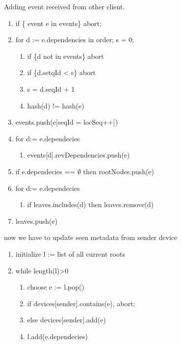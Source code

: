 
\noindent Adding event received from other client.
\begin{enumerate}
    \item if \{ event e in events\} abort;
    \item for d := e.dependencies in order; s = 0;
    \begin{enumerate}
        \item if \{d not in events\} abort
        \item if \{d.setqId < s\} abort
        \item s = d.seqId + 1
        \item hash(d) != hash(e)
    \end{enumerate}
    \item events.push(e[seqId = locSeq++])
    \item for d:= e.dependecies
    \begin{enumerate}
        \item events[d].revDependencies.push(e)
    \end{enumerate}
    \item if e.dependecies == $\emptyset$ then rootNodes.push(e)
    \item for d:= e.dependecies
    \begin{enumerate}
        \item if leaves.includes(d) then leaves.remove(d)
    \end{enumerate} 
    \item leaves.push(e) 
\end{enumerate}

now we have to update seen metadata from sender device

\begin{enumerate}
    \item initialize l := list of all current roots
    \item while length(l)>0 
    \begin{enumerate}
        \item choose e := l.pop()
        \item if devices[sender].contains(e), abort;
        \item else devices[sender].add(e)
        \item l.add(e.dependecies)
    \end{enumerate}
\end{enumerate}


